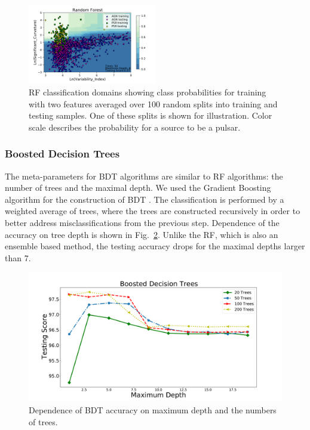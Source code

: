 \begin{figure}[h]
\centering
\includegraphics[width=0.5\textwidth]{plots/classification_domains/rf_50_6_final.pdf}
\caption{RF classification domains showing class probabilities for training with two features
averaged over 100 random splits into training and testing samples.
One of these splits is shown for illustration.
Color scale describes the probability for a source to be a pulsar.
}
\label{fig:RF_domains}
\end{figure}



\subsubsection{Boosted Decision Trees}

The meta-parameters for BDT algorithms are similar to RF algorithms: the number of trees and the maximal depth.
We used the Gradient Boosting algorithm for the construction of BDT \citep{gb}.
The classification is performed by a weighted average of trees, where the trees are constructed recursively in order to better address 
misclassifications from the previous step. 
Dependence of the accuracy on tree depth is shown in Fig.~\ref{fig:BDT_depth}. 
Unlike the RF, which is also an ensemble based method, the testing accuracy drops for the maximal depths larger than 7. 


\begin{figure}[h]
\centering
\includegraphics[width=\twopicsp\textwidth]{plots/bdt_train_assocnewfeats.pdf}
\caption{Dependence of BDT accuracy on maximum depth and the numbers of trees.}
\label{fig:BDT_depth}
\end{figure}

